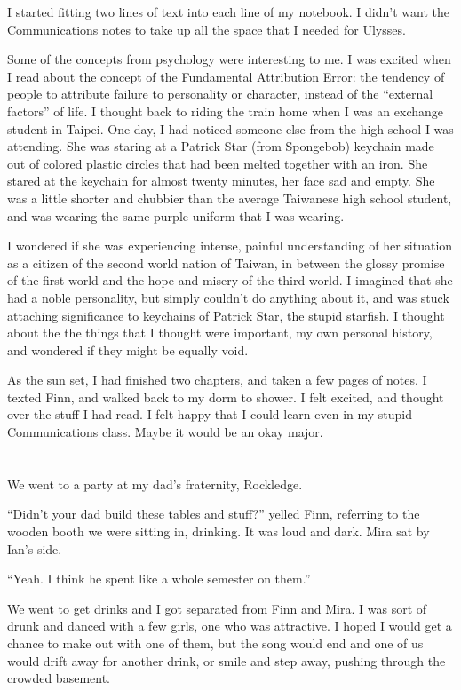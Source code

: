 I started fitting two lines of text into each line of my notebook.  I didn't
want the Communications notes to take up all the space that I needed for
Ulysses.  

Some of the concepts from psychology were interesting to me.  I was excited when
I read about the concept of the Fundamental Attribution Error: the tendency of
people to attribute failure to personality or character, instead of the
``external factors'' of life.  I thought back to riding the train home when I
was an exchange student in Taipei.  One day, I had noticed someone else from the
high school I was attending.  She was staring at a Patrick Star (from Spongebob)
keychain made out of colored plastic circles that had been melted together with
an iron.  She stared at the keychain for almost twenty minutes, her face sad and
empty.  She was a little shorter and chubbier than the average Taiwanese high
school student, and was wearing the same purple uniform that I was wearing.

I wondered if she was experiencing intense, painful understanding of her
situation as a citizen of the second world nation of Taiwan, in between the
glossy promise of the first world and the hope and misery of the third world.  I
imagined that she had a noble personality, but simply couldn't do anything about
it, and was stuck attaching significance to keychains of Patrick Star, the
stupid starfish.  I thought about the the things that I thought were important,
my own personal history, and wondered if they might be equally void.

As the sun set, I had finished two chapters, and taken a few pages of notes.  I
texted Finn, and walked back to my dorm to shower.  I felt excited, and thought
over the stuff I had read.  I felt happy that I could learn even in my stupid
Communications class.  Maybe it would be an okay major.

\section{}

We went to a party at my dad's fraternity, Rockledge.  

``Didn't your dad build these tables and stuff?'' yelled Finn, referring to the
wooden booth we were sitting in, drinking.  It was loud and dark.  Mira sat by
Ian's side.  

``Yeah.  I think he spent like a whole semester on them.''

We went to get drinks and I got separated from Finn and Mira.  I was sort of
drunk and danced with a few girls, one who was attractive.  I hoped I would get
a chance to make out with one of them, but the song would end and one of us
would drift away for another drink, or smile and step away, pushing through the
crowded basement.  

